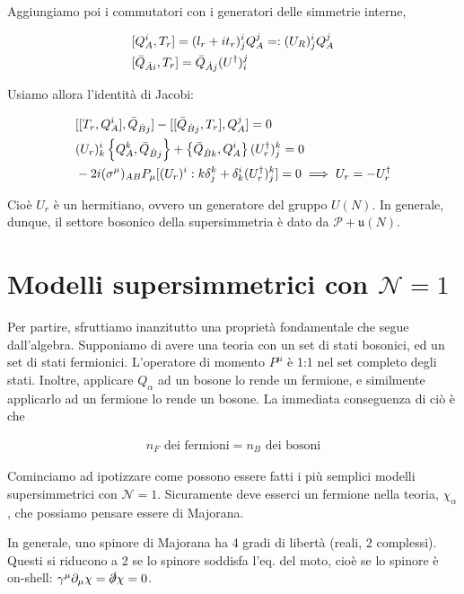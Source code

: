 \documentclass{report}
\begin{document}
Aggiungiamo poi i commutatori con i generatori delle simmetrie interne, 

\begin{align}
    &[Q^i_A, T_r] = (l_r +it_r)^i_j Q^j_A =: (U_R)^i_j Q_A^j \notag \\
    &[\bar{Q}_{\dot{A} i}, T_r] = \bar{Q}_{\dot{A} j}(U^\dagger)^j_i 
\end{align}

Usiamo allora l'identità di Jacobi: 

\begin{align}
    &[[T_r, Q_A^i], \bar{Q}_{\dot{B}j}] - [[\bar{Q}_{\dot{B}j}, T_r], Q_A^j] = 0 \notag \\
    &(U_r)^i_k \left\{Q_A^k, \bar{Q}_{\dot{B}j} \right\} + \left\{\bar{Q}_{\dot{B}k}, Q_A^i \right\}(U_r^\dagger)^k_j = 0 \notag \\
    &-2i(\sigma^\mu)_{AB}P_\mu [(U_r)^i:k \delta^k_j + \delta^i_k (U_r^\dagger)^k_j] = 0 \implies U_r = -U_r^\dagger
\end{align}

Cioè \(U_r\) è un hermitiano, ovvero un generatore del gruppo \(U(N)\). In generale, dunque, il settore bosonico della supersimmetria è dato da \(\mathcal{P} + \mathfrak{u}(N)\).

\chapter{Modelli supersimmetrici con \(\mathcal{N} = 1\)}

Per partire, sfruttiamo inanzitutto una proprietà fondamentale che segue dall'algebra. Supponiamo di avere una teoria con un set di stati bosonici, ed un set di stati fermionici. L'operatore di momento \(P^\mu\) è 1:1 nel set completo degli stati. Inoltre, applicare \(Q_\alpha\) ad un bosone lo rende un fermione, e similmente applicarlo ad un fermione lo rende un bosone. La immediata conseguenza di ciò è che 

\begin{align}
    n_F \text{ dei fermioni} = n_B \text{ dei bosoni}
\end{align}

Cominciamo ad ipotizzare come possono essere fatti i più semplici modelli supersimmetrici con \(\mathcal{N} = 1\). Sicuramente deve esserci un fermione nella teoria, \(\chi_\alpha\), che possiamo pensare essere di Majorana. 

In generale, uno spinore di Majorana ha 4 gradi di libertà (reali, 2 complessi). Questi si riducono a 2 se lo spinore soddisfa l'eq. del moto, cioè se lo spinore è on-shell: \(\gamma^\mu \partial_\mu \chi = \slashed{\partial}\chi = 0\). 
\end{document}
